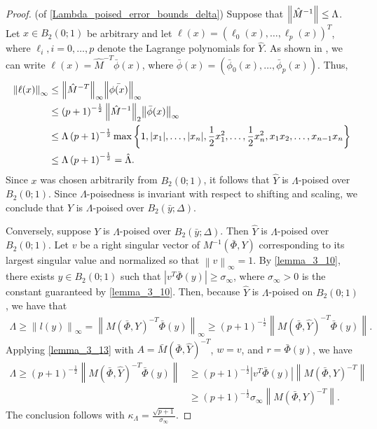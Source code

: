 \documentclass{article}
\begin{document}
\begin{proof}(of \cref{Lambda_poised_error_bounds_delta})
Suppose that ${\left\|\hat{M}^{-1}\right\|} \le \Lambda$.    
Let $x \in B_2(0;1)$ be arbitrary and let $\ell(x) = (\ell_0(x), \ldots, \ell_p(x))^T$, where $\ell_i, i=0,\ldots,p$ denote the Lagrange polynomials for $\hat{Y}$.
As shown in \cite{introduction_book}, we can write $\ell(x) = \hat{M}^{-T}\bar{\phi}(x)$, 
where $\bar{\phi}(x) = (\bar{\phi}_0(x), \ldots, \bar{\phi}_p(x))$.
Thus,
\begin{align*}
{\left\|\ell(x)\right\|}_{\infty} & \le {\left\|\hat{M}^{-T}\right\|}_{\infty} {\left\|\bar{\phi(x)}\right\|}_{\infty} \\
& \le \left(p+1\right)^{-\frac 1 2} {\left\|\hat{M}^{-1}\right\|}_2 {\left\|\bar{\phi}(x)\right\|}_{\infty} \\
& \le \Lambda \left(p+1\right)^{-\frac 1 2} \max\left\{1, |x_1|, \ldots,|x_n|, \frac 1 2 x_1^2, \ldots, \frac 1 2 x_n^2, x_1x_2, \ldots, x_{n-1}x_n\right\}\\
& \le \Lambda \left(p+1\right)^{-\frac 1 2}   = \hat{\Lambda}.
\end{align*}
Since $x$ was chosen arbitrarily from $B_2(0;1)$, it follows that $\hat{Y}$ is $\Lambda$-poised over $B_2(0;1)$.   Since $\Lambda$-poisedness is invariant with respect to shifting and scaling,  we conclude that $Y$ is $\Lambda$-poised over $B_2(\bar{y};\Delta)$.

Conversely, suppose $Y$ is $\Lambda$-poised over $B_2(\bar{y};\Delta)$.  Then $\hat{Y}$ is $\Lambda$-poised over $B_2(0;1)$.    Let $v$ be a right singular vector of $M^{-1}\left(\bar \Phi, Y\right)$ 
corresponding to its largest singular value and normalized so that $\left\|v\right\|_{\infty} = 1$.    By \cref{lemma_3_10},  there exists $y \in B_2\left(0; 1\right)$ such that
$\left| v^T \bar {\Phi}(y) \right| \ge {\sigma_{\infty}}$, where $\sigma_{\infty} > 0$ is the constant guaranteed by \cref{lemma_3_10}.
Then, because $\hat Y$ is $\Lambda$-poised on $B_2(0; 1)$, we have that 
\begin{align*}
\Lambda 
\ge \left\|l(y)\right\|_{\infty} 
= \left\|M\left(\bar \Phi, Y\right)^{-T} \bar \Phi(y)\right\|_{\infty}
\ge \left(p+1\right)^{-\frac1 2 }\left\|M\left(\bar \Phi, \hat Y\right)^{-T} \bar{\Phi}(y)\right\|.
\end{align*}
Applying \cref{lemma_3_13} with $A = {\bar M}\left(\bar \Phi, \hat Y\right)^{-T}$, $w = v$, and $r = \bar \Phi(y)$, we have
\begin{align*}
\Lambda 
\ge \left(p+1\right)^{-\frac1 2 }\left\|M\left(\bar \Phi, \hat Y\right)^{-T} \bar{\Phi}(y)\right\|
&\ge \left(p+1\right)^{-\frac1 2 }|v^T \bar \Phi(y)| \left\|M\left(\bar \Phi, Y\right)^{-T}\right\| \\
&\ge \left(p+1\right)^{-\frac1 2 }\sigma_{\infty} \left\|M\left(\bar \Phi, Y\right)^{-T}\right\|.
\end{align*}
The conclusion follows with $\kappa_{\Lambda} = \frac {\sqrt{p+1}}{\sigma_{\infty}}$.
\end{proof}
\end{document}
